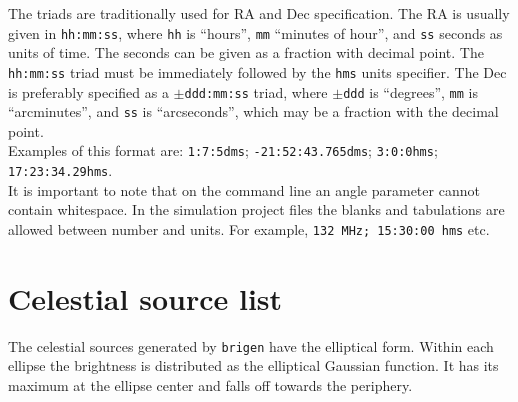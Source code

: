 \documentclass[letterpaper, oneside, 11pt]{article}
\begin{document}
The triads are traditionally used for RA and Dec specification. The RA is usually given in {\tt hh:mm:ss}, where {\tt hh} is ``hours'', {\tt mm} ``minutes of hour'', and {\tt ss} seconds as units of time. The seconds can be given as a fraction with decimal point. The {\tt hh:mm:ss} triad must be immediately followed by the {\tt hms} units specifier. The Dec is preferably specified as a {\tt $\pm$ddd:mm:ss} triad, where {\tt $\pm$ddd} is ``degrees'', {\tt mm} is ``arcminutes'', and {\tt ss} is ``arcseconds'', which may be a fraction with the decimal point.\\

Examples of this format are: {\tt 1:7:5dms}; {\tt -21:52:43.765dms}; {\tt 3:0:0hms}; {\tt 17:23:34.29hms}.\\

It is important to note that on the command line an angle parameter cannot contain whitespace. In the simulation project files the blanks and tabulations are allowed between number and units. For example, {\tt 132 MHz; 15:30:00 hms} etc.

\section{Celestial source list}

The celestial sources generated by {\tt brigen} have the elliptical form. Within each ellipse the brightness is distributed as the elliptical Gaussian function. It has its maximum at the ellipse center and falls off towards the periphery.
\end{document}
